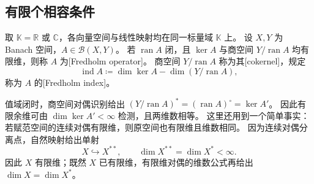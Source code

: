 \subsection{有限个相容条件}
\label{b1:subsec:C10403}

\begin{definition}\label{b1:def:C1-fredholm-operator}
取 \(\mathbb K=\mathbb R\) 或 \(\mathbb C\)，各向量空间与线性映射均在同一标量域 \(\mathbb K\) 上。
设 \(X,Y\) 为 Banach 空间，\(A\in\mathcal B(X,Y)\)。
若 \(\operatorname{ran}A\) 闭，且 \(\ker A\) 与商空间 \(Y/\operatorname{ran}A\)
均有限维，则称 \(A\) 为[Fredholm operator]。
商空间 \(Y/\operatorname{ran}A\) 称为其[cokernel]，规定
\[
 \operatorname{ind}A\coloneqq\dim\ker A-\dim(Y/\operatorname{ran}A),
\]
称为 \(A\) 的[Fredholm index]。
\end{definition}

值域闭时，商空间对偶识别给出
\((Y/\operatorname{ran}A)^*=(\operatorname{ran}A)^\circ=\ker A'\)。
因此有限余维可由 \(\dim\ker A'<\infty\) 检测，且两维数相等。
这里还用到一个简单事实：若赋范空间的连续对偶有限维，则原空间也有限维且维数相同。
因为连续对偶分离点，自然映射给出单射
\[
 X\hookrightarrow X^{**},\qquad \dim X^{**}=\dim X^*<\infty.
\]
因此 \(X\) 有限维；既然 \(X\) 已有限维，有限维对偶的维数公式再给出
\(\dim X=\dim X^*\)。

